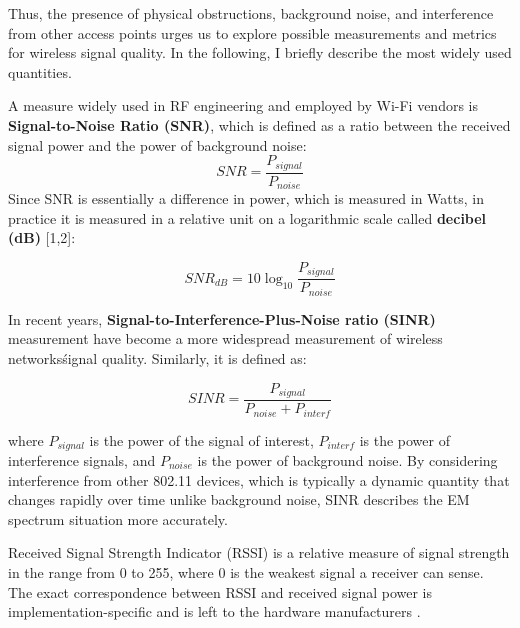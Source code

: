 Thus, the presence of physical obstructions, background noise, and interference from other access points urges us to explore possible measurements and metrics for wireless signal quality. In the following, I briefly describe the most widely used quantities.

A measure widely used in RF engineering and employed by Wi-Fi vendors is \textbf{Signal-to-Noise Ratio (SNR)}, which is defined as a ratio between the received signal power and the power of background noise:
\begin{equation}
    \label{formula:snr}
    SNR = \frac{P_{signal}}{P_{noise}}
\end{equation}
    Since SNR is essentially a difference in power, which is measured in Watts, in practice it is measured in a relative unit on a logarithmic scale called \textbf{decibel (dB)} [1,2]:

\begin{equation}
    \label{formula:snr_db}
    {SNR}_{dB} = 10\log_{10}\frac{P_{signal}}{P_{noise}}
\end{equation}

In recent years, \textbf{Signal-to-Interference-Plus-Noise ratio (SINR)} measurement have become a more widespread measurement of wireless networks\' signal quality. Similarly, it is defined as:

\begin{equation}
    \label{formula:sinr}
    SINR = \frac{P_{signal}}{P_{noise} + P_{interf}}
\end{equation}

    where $P_{signal}$ is the power of the signal of interest, $P_{interf}$ is the power of interference signals, and $P_{noise}$ is the power of background noise.
    By considering interference from other 802.11 devices, which is typically a dynamic quantity that changes rapidly over time unlike background noise, SINR describes the EM spectrum situation more accurately.

Received Signal Strength Indicator (RSSI) is a relative measure of signal strength in the range from 0 to 255, where 0 is the weakest signal a receiver can sense. The exact correspondence between RSSI and received signal power is implementation-specific and is left to the hardware manufacturers \cite{colemanCWNACertifiedWireless2021}.

